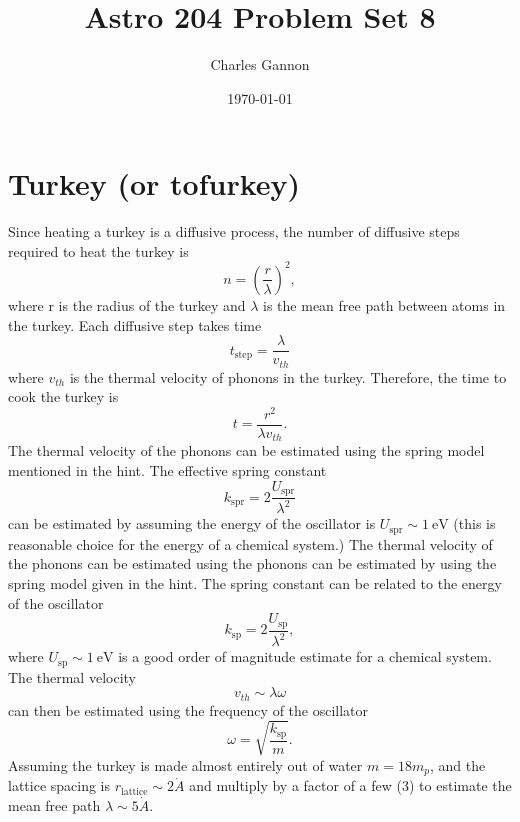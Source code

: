 \documentclass[11pt]{article}
\author{Charles Gannon}
\date{\today}
\title{Astro 204 Problem Set 8}
\begin{document}
\maketitle
\tableofcontents

\section{Turkey (or tofurkey)}
\label{sec:orgfce2d69}
Since heating a turkey is a diffusive process, the number of diffusive steps required to heat the turkey is
\begin{equation}
 n = \left( \frac{r}{\lambda}  \right)^2,
\end{equation}
where r is the radius of the turkey and \(\lambda\) is the mean free path between atoms in the turkey.
Each diffusive step takes time
\begin{equation}
 t_{\text{step}} = \frac{\lambda}{v_{th}}
\end{equation}
where \(v_{th}\) is the thermal velocity of phonons in the turkey.
Therefore, the time to cook the turkey is
\begin{equation}
 t = \frac{r^2}{\lambda v_{th}}.
\end{equation}
The thermal velocity of the phonons can be estimated using the spring model mentioned in the hint.
The effective spring constant
\begin{equation}
 k_{\text{spr}} = 2 \frac{U_{\text{spr}}}{\lambda^2}
\end{equation}
can be estimated by assuming the energy of the oscillator is \(U_{\text{spr}} \sim 1 ~\text{eV}\) (this is reasonable choice for the energy of a chemical system.)
The thermal velocity of the phonons can be estimated using the phonons can be estimated by using the spring model given in the hint.
The spring constant can be related to the energy of the oscillator
\begin{equation}
  k_{\text{sp}} = 2 \frac{U_{\text{sp}}}{\lambda^2},
\end{equation}
where \(U_{\text{sp}} \sim 1 ~ \text{eV}\) is a good order of magnitude estimate for a chemical system.
The thermal velocity
\begin{equation}
 v_{th} \sim \lambda \omega
\end{equation}
can then be estimated using the frequency of the oscillator
\begin{equation}
 \omega = \sqrt{\frac{k_{\text{sp}}}{m}}.
\end{equation}
Assuming the turkey is made almost entirely out of water \(m = 18 m_{p}\), and the lattice spacing is \(r_{\text{lattice}} \sim 2 \dot{A}\) and multiply by a factor of a few (3) to estimate the mean free path \(\lambda \sim 5 \dot{A}\).
\end{document}
